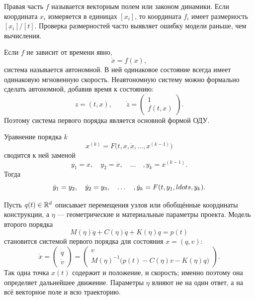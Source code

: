 Правая часть $f$ называется векторным полем или законом динамики. Если координата $x_i$ измеряется в единицах $[x_i]$, то координата $f_i$ имеет размерность $[x_i]/[t]$. Проверка размерностей часто выявляет ошибку модели раньше, чем вычисления.

Если $f$ не зависит от времени явно,
\begin{equation}
\label{eq:autonomous-ode-v01}
\dot x=f(x),
\end{equation}
система называется автономной. В ней одинаковое состояние всегда имеет одинаковую мгновенную скорость. Неавтономную систему можно формально сделать автономной, добавив время к состоянию:
\[
z=(t,x),
\qquad
\dot z=
\begin{pmatrix}
1\\
f(t,x)
\end{pmatrix}.
\]
Поэтому система первого порядка является основной формой ОДУ.

Уравнение порядка $k$
\[
x^{(k)}
=
F\bigl(t,x,\dot x,\ldots,x^{(k-1)}\bigr)
\]
сводится к ней заменой
\[
y_1=x,
\quad
y_2=\dot x,
\quad\ldots\quad,
y_k=x^{(k-1)}.
\]
Тогда
\begin{equation}
\label{eq:higher-order-to-first-order-v01}
\dot y_1=y_2,
\quad
\dot y_2=y_3,
\quad\ldots\quad,
\dot y_k=F(t,y_1,\\ldots,y_k).
\end{equation}

\begin{application}
Пусть $q(t)\in\mathbb{R}^d$ описывает перемещения узлов или обобщённые координаты конструкции, а $\eta$ --- геометрические и материальные параметры проекта. Модель второго порядка
\begin{equation}
\label{eq:mechanical-design-second-order-v01}
M(\eta)\ddot q
+C(\eta)\dot q
+K(\eta)q
=p(t)
\end{equation}
становится системой первого порядка для состояния $x=(q,v)$:
\begin{equation}
\label{eq:mechanical-design-first-order-v01}
\dot x
=
\begin{pmatrix}
\dot q\\
\dot v
\end{pmatrix}
=
\begin{pmatrix}
v\\
M(\eta)^{-1}
\bigl(p(t)-C(\eta)v-K(\eta)q\bigr)
\end{pmatrix}.
\end{equation}
Так одна точка $x(t)$ содержит и положение, и скорость; именно поэтому она определяет дальнейшее движение. Параметры $\eta$ влияют не на один ответ, а на всё векторное поле и всю траекторию.
\end{application}

